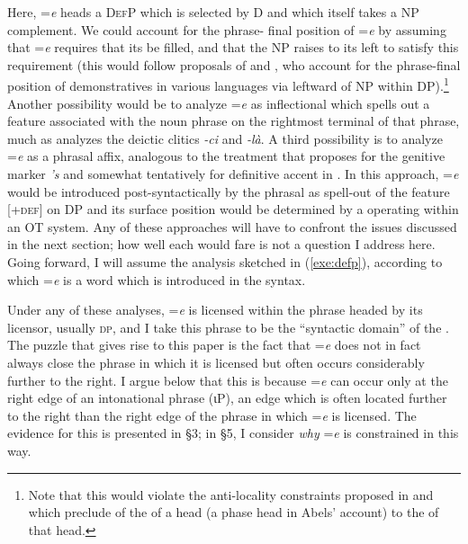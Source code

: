\documentclass[output=paper,
modfonts
]{LSP/langsci}
\begin{document}
\noindent
Here, =\emph{e} heads a \textsc{DefP} which is selected by D and which itself takes a NP complement. We could account for the phrase-
final position of =\emph{e} by assuming that =\emph{e} requires that its  be filled, and that the NP  raises to its left to 
satisfy this requirement (this would follow proposals of \citealt{cinque2005} and \citealt{simpson2005}, who account for the phrase-final position of demonstratives in various languages via leftward  of NP within DP).\footnote
{Note that this  would violate the anti-locality constraints proposed in \citet{pesetsky2001} and \citet{abels2003} which preclude 
of the  of a head (a phase head in Abels' account) to the  of that head.}
 Another possibility would be to analyze =\emph{e} as inflectional 
 which spells out a  feature associated with the noun phrase on the rightmost terminal of that phrase, much as 
\citet{miller1991ais} analyzes the  deictic clitics \emph{-ci} and \emph{-l\`{a}}. A third possibility is to analyze =\emph{e} as a phrasal affix, 
analogous to the treatment that \citet{anderson2005} proposes for the  genitive marker \emph{'s} and somewhat tentatively for 
definitive accent in . In this approach, =\emph{e} would be introduced post-syntactically by the phrasal  as spell-out of 
the feature [\textsc{+def}]  on DP and its surface position would be determined by a  operating within an OT  system.
Any of these approaches will have to confront the issues discussed in the next section; how well each would fare is not
a question I address here.
Going forward, I will assume the analysis sketched in (\ref{exe:defp}), according to which =\emph{e} is a  
word which is introduced in the syntax. 

Under any of these analyses, =\emph{e} is licensed within the phrase headed by its licensor, usually \textsc{dp}, and I take this 
phrase to be the ``syntactic domain'' of the .  
The puzzle that gives rise to this paper is the fact that =\emph{e} does not in fact always close the phrase in 
which it is licensed but often occurs considerably further to the right.  
I argue below that this is because =\emph{e} can occur only at 
the right edge of an intonational phrase (ιP), an edge which is often located further to the right than the right edge of the
phrase in  which  =\emph{e} is licensed. The evidence for this is presented in \S3; in \S5, I consider \emph{why} =\emph{e}
is constrained in this way.
\end{document}
